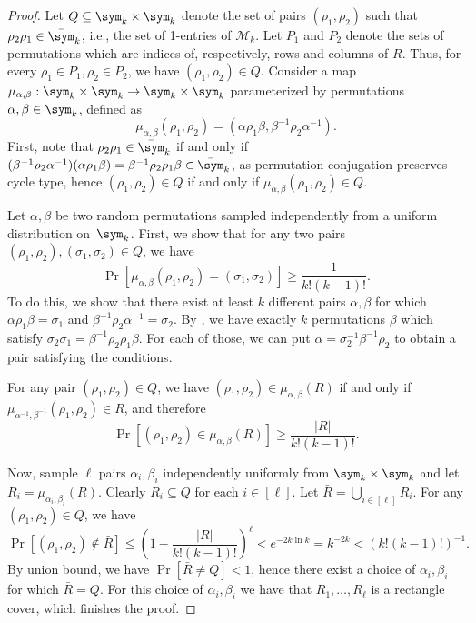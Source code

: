 \begin{proof}
    Let $Q \subseteq \sym_k \times \sym_k$ denote the set of pairs $(\rho_1, \rho_2)$ such that $\rho_2\rho_1 \in \bar\sym_k$, i.e., the set of 1-entries of $\mathcal{M}_k$. Let $P_1$ and $P_2$ denote the sets of permutations which are indices of, respectively, rows and columns of $R$. Thus, for every $\rho_1 \in P_1, \rho_2 \in P_2$, we have $(\rho_1, \rho_2) \in Q$.
    Consider a map $\mu_{\alpha, \beta} : \sym_k \times \sym_k \to \sym_k \times \sym_k$ parameterized by permutations $\alpha, \beta \in \sym_k$, defined as
    $$
        \mu_{\alpha, \beta} (\rho_1, \rho_2) =
        (\alpha \rho_1 \beta, \beta^{-1} \rho_2 \alpha^{-1}).
    $$
    First, note that $\rho_2 \rho_1 \in \bar\sym_k$ if and only if $(\beta^{-1}\rho_2\alpha^{-1}) (\alpha \rho_1 \beta) = \beta^{-1} \rho_2 \rho_1 \beta \in \bar\sym_k$, as permutation conjugation preserves cycle type, hence $(\rho_1, \rho_2) \in Q$ if and only if $\mu_{\alpha, \beta}(\rho_1, \rho_2) \in Q$.

    Let $\alpha, \beta$ be two random permutations sampled independently from a uniform distribution on~$\sym_k$. First, we show that for any two pairs $(\rho_1, \rho_2), (\sigma_1, \sigma_2) \in Q$, we have
    $$
    \Pr[\mu_{\alpha, \beta}(\rho_1, \rho_2) = (\sigma_1, \sigma_2)] \geq \frac{1}{k!(k - 1)!}.
    $$
    To do this, we show that there exist at least $k$ different pairs $\alpha, \beta$ for which $\alpha \rho_1 \beta = \sigma_1$ and $\beta^{-1} \rho_2 \alpha^{-1} = \sigma_2$. By , we have exactly $k$ permutations $\beta$ which satisfy $\sigma_2 \sigma_1 = \beta^{-1} \rho_2 \rho_1 \beta$. For each of those, we can put $\alpha = \sigma_2^{-1} \beta^{-1} \rho_2$ to obtain a pair satisfying the conditions.

    For any pair $(\rho_1, \rho_2) \in Q$, we have $(\rho_1, \rho_2) \in \mu_{\alpha, \beta}(R)$ if and only if $\mu_{\alpha^{-1}, \beta^{-1}}(\rho_1, \rho_2) \in R$, and therefore
    $$
    \Pr[(\rho_1, \rho_2) \in \mu_{\alpha, \beta}(R)] \geq \frac{|R|}{k!(k - 1)!}.
    $$

    Now, sample $\ell$ pairs $\alpha_i, \beta_i$ independently uniformly from $\sym_k \times \sym_k$ and let $R_i = \mu_{\alpha_i, \beta_i}(R)$. Clearly $R_i \subseteq Q$ for each $i \in [\ell]$. Let $\bar{R} = \bigcup_{i \in [\ell]} R_i$. For any $(\rho_1, \rho_2) \in Q$, we have
    $$
    \Pr\left[(\rho_1, \rho_2) \not\in \bar{R}\right] \leq \left(1 - \frac{|R|}{k!(k - 1)!} \right)^{\ell} < e^{-2k \ln k} = k^{-2k} < (k!(k - 1)!)^{-1}.
    $$
    By union bound, we have
    $
    \Pr \left[ \bar{R} \neq Q \right] < 1
    $,
    hence there exist a choice of $\alpha_i, \beta_i$ for which $\bar{R} = Q$. For this choice of $\alpha_i,\beta_i$ we have that $R_1,\ldots,R_\ell$ is a rectangle cover, which finishes the proof.
\end{proof}



